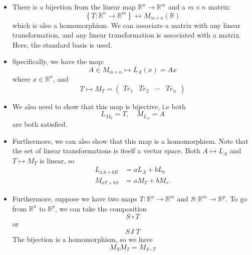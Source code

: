 \begin{itemize}
    \item There is a bijection from the linear map $\mathbb{R}^n \to \mathbb{R}^m$ and a $m\times n$ matrix:
    \begin{equation}
        \left\{T:\mathbb{R}^n \to \mathbb{R}^m\right\} \longleftrightarrow M_{m\times n}(\mathbb{R})
    \end{equation}
    which is also a homomorphism. We can associate a matrix with any linear transformation, and any linear transformation is associated with a matrix. Here, the standard basis is used.
    \item Specifically, we have the map:
    \begin{equation}
        A \in M_{m\times n} \mapsto     L_A(x)= Ax
    \end{equation}
    where $x\in \mathbb{R}^n$, and 
    \begin{equation}
        T \mapsto M_T = \begin{pmatrix}
            Te_1 & Te_2 & \cdots & Te_n
        \end{pmatrix}
    \end{equation}
    \item We also need to show that this map is bijective, i.e both 
    \begin{equation}
        L_{M_T}=T,\quad M_{L_A}=A
    \end{equation}
    are both satisfied.
    \item Furthermore, we can also show that this map is a homomorphism. Note that the set of linear transformations is itself a vector space. Both $A\mapsto L_A$ and $T\mapsto M_T$ is linear, so 
    \begin{align}
        L_{aA+bB} &= aL_A + bL_b \\ 
        M_{aT+bS} &= aM_T+bM_s.
    \end{align}
    \item Furthermore, suppose we have two maps $T:\mathbb{R}^n \rightarrow \mathbb{R}^m$ and $S:\mathbb{R}^m \rightarrow \mathbb{R}^p$. To go from $\mathbb{R}^n$ to $\mathbb{R}^p$, we can take the composition 
    \begin{equation}
        S \circ T
    \end{equation}
    or
    \begin{equation}
        S \sslash T
    \end{equation}
    The bijection is a homomorphism, so we have 
    \begin{equation}
        M_S M_T = M_{S \circ T}
    \end{equation}
\end{itemize}